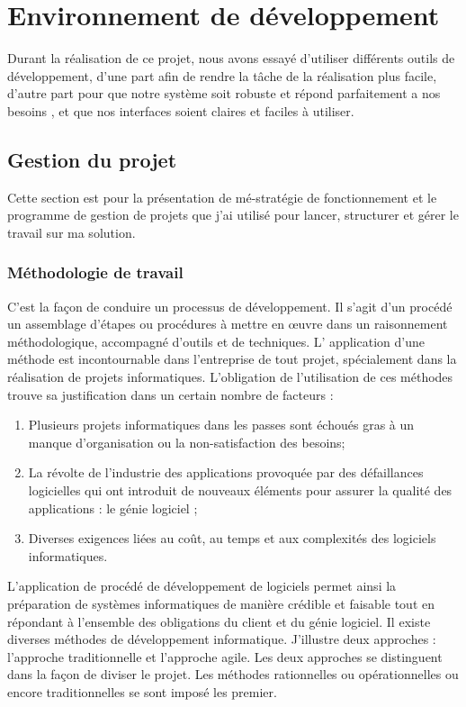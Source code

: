 \chapter{Environnement de développement}
\label{sec:EnvironnementDeTravail}
Durant la réalisation de ce projet, nous avons essayé d’utiliser différents
outils de développement, d’une part afin de rendre la tâche de la
réalisation plus facile, d’autre part pour que notre système soit robuste et
répond parfaitement a nos besoins , et que nos interfaces soient claires et
faciles à utiliser.
\section{Gestion du projet}
Cette section est pour la présentation de mé-stratégie de fonctionnement et le programme de gestion de projets que j'ai utilisé pour lancer, structurer et gérer le travail sur ma solution.
\subsection{Méthodologie de travail}
C'est la façon de conduire un processus de développement. Il s’agit d'un procédé un assemblage d’étapes ou procédures à mettre en œuvre dans un raisonnement méthodologique, accompagné d’outils et de techniques. L' application d'une méthode est incontournable dans l'entreprise de tout projet, spécialement dans la réalisation de projets informatiques. \newline
L'obligation de l'utilisation de ces méthodes trouve sa justification dans un certain nombre de facteurs :
\begin{enumerate}
	\item Plusieurs projets informatiques dans les passes sont échoués gras à un manque d'organisation ou la non-satisfaction des besoins;
	\item La révolte de l'industrie des applications provoquée par des défaillances logicielles qui ont introduit de nouveaux éléments pour assurer la qualité des applications : le génie logiciel ;
	\item Diverses exigences liées au coût, au temps et aux complexités des logiciels informatiques.
\end{enumerate}

L'application de procédé de développement de logiciels permet ainsi la préparation de systèmes informatiques de manière crédible et faisable tout en répondant à l'ensemble des obligations du client et du génie logiciel.
\newline \newline
Il existe diverses méthodes de développement informatique. J'illustre deux approches : l’approche traditionnelle et l’approche agile. Les deux approches se distinguent  dans la façon de diviser le projet. Les méthodes  rationnelles ou opérationnelles ou encore traditionnelles se sont imposé les premier.
